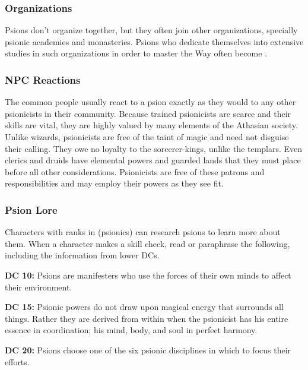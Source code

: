 \subsubsection{Organizations}
Psions don't organize together, but they often join other organizations, specially psionic academies and monasteries. Psions who dedicate themselves into extensive studies in such organizations in order to master the Way often become .

\subsubsection{NPC Reactions}
The common people usually react to a psion exactly as they would to any other psionicists in their community. Because trained psionicists are scarce and their skills are vital, they are highly valued by many elements of the Athasian society. Unlike wizards, psionicists are free of the taint of magic and need not disguise their calling. They owe no loyalty to the sorcerer-kings, unlike the templars. Even clerics and druids have elemental powers and guarded lands that they must place before all other considerations. Psionicists are free of these patrons and responsibilities and may employ their powers as they see fit.

\subsubsection{Psion Lore}
Characters with ranks in  (psionics) can research psions to learn more about them. When a character makes a skill check, read or paraphrase the following, including the information from lower DCs.

\textbf{DC 10:} Psions are manifesters who use the forces of their own minds to affect their environment.

\textbf{DC 15:} Psionic powers do not draw upon magical energy that surrounds all things. Rather they are derived from within when the psionicist has his entire essence in coordination; his mind, body, and soul in perfect harmony.

\textbf{DC 20:} Psions choose one of the six psionic disciplines in which to focus their efforts.
